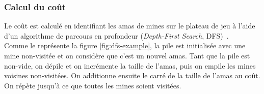 \subsubsection*{Calcul du coût}
Le coût est calculé en identifiant les amas de mines sur le plateau de jeu à l'aide d'un algorithme de parcours en profondeur (\textit{Depth-First Search}, DFS)~\cite{cosson2023breadth}.\\
Comme le représente la figure \ref{fig:dfs-example}, la pile est initialisée avec une mine non-visitée et on considère que c'est un nouvel amas.
Tant que la pile est non-vide, on dépile et on incrémente la taille de l'amas, puis on empile les mines voisines non-visitées.
On additionne ensuite le carré de la taille de l'amas au coût.
On répète jusqu'à ce que toutes les mines soient visitées.\\\\
